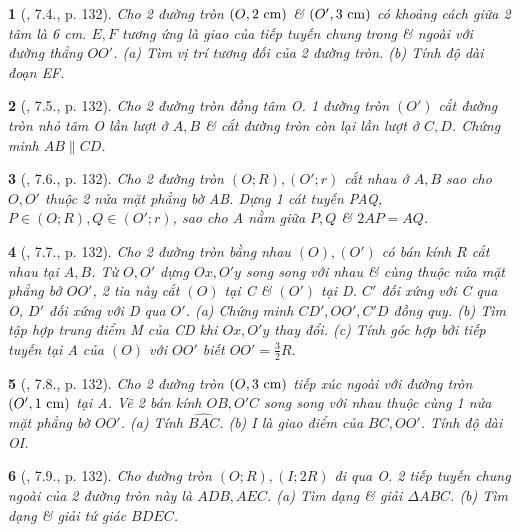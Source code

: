 \documentclass{article}
\newtheorem{baitoan}{}
\begin{document}
\begin{baitoan}[\cite{Binh_boi_duong_Toan_9_tap_1}, 7.4., p. 132]
	Cho 2 đường tròn $(O,2\ {\rm cm})$ \& $(O',3\ {\rm cm})$ có khoảng cách giữa 2 tâm là {\rm6 cm}. $E,F$ tương ứng là giao của tiếp tuyến chung trong \& ngoài với đường thẳng $OO'$. (a) Tìm vị trí tương đối của 2 đường tròn. (b) Tính độ dài đoạn EF.
\end{baitoan}

\begin{baitoan}[\cite{Binh_boi_duong_Toan_9_tap_1}, 7.5., p. 132]
	Cho 2 đường tròn đồng tâm O. 1 đường tròn $(O')$ cắt đường tròn nhỏ tâm O lần lượt ở $A,B$ \& cắt đường tròn còn lại lần lượt ở $C,D$. Chứng minh $AB\parallel CD$.
\end{baitoan}

\begin{baitoan}[\cite{Binh_boi_duong_Toan_9_tap_1}, 7.6., p. 132]
	Cho 2 đường tròn $(O;R),(O';r)$ cắt nhau ở $A,B$ sao cho $O,O'$ thuộc 2 nửa mặt phẳng bờ AB. Dựng 1 cát tuyến PAQ, $P\in(O;R),Q\in(O';r)$, sao cho A nằm giữa $P,Q$ \& $2AP = AQ$.
\end{baitoan}

\begin{baitoan}[\cite{Binh_boi_duong_Toan_9_tap_1}, 7.7., p. 132]
	Cho 2 đường tròn bằng nhau $(O),(O')$ có bán kính $R$ cắt nhau tại $A,B$. Từ $O,O'$ dựng $Ox,O'y$ song song với nhau \& cùng thuộc nửa mặt phẳng bở $OO'$, 2 tia này cắt $(O)$ tại C \& $(O')$ tại D. $C'$ đối xứng với C qua O, $D'$ đối xứng với D qua $O'$. (a) Chứng minh $CD',OO',C'D$ đồng quy. (b) Tìm tập hợp trung điểm M của CD khi $Ox,O'y$ thay đổi. (c) Tính góc hợp bởi tiếp tuyến tại A của $(O)$ với $OO'$ biết $OO' = \frac{3}{2}R$.
\end{baitoan}

\begin{baitoan}[\cite{Binh_boi_duong_Toan_9_tap_1}, 7.8., p. 132]
	Cho 2 đường tròn $(O,3\ {\rm cm})$ tiếp xúc ngoài với đường tròn $(O',1\ {\rm cm})$ tại A. Vẽ 2 bán kính $OB,O'C$ song song với nhau thuộc cùng 1 nửa mặt phẳng bờ $OO'$. (a) Tính $\widehat{BAC}$. (b) I là giao điểm của $BC,OO'$. Tính độ dài OI.
\end{baitoan}

\begin{baitoan}[\cite{Binh_boi_duong_Toan_9_tap_1}, 7.9., p. 132]
	Cho đường tròn $(O;R),(I;2R)$ đi qua O. 2 tiếp tuyến chung ngoài của 2 đường tròn này là $ADB,AEC$. (a) Tìm dạng \& giải $\Delta ABC$. (b) Tìm dạng \& giải tứ giác $BDEC$.
\end{baitoan}
\end{document}
